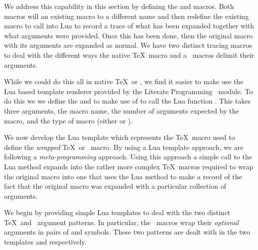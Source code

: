 \stopTestSuite


We address this capability in this section by defining 
the \type{\traceTexMacro} and \type{\traceContextMacro} macros. Both 
macros will \type{\let} an existing macro to a different name and then 
redefine the existing macro to call into Lua to record a trace of what has 
been expanded together with what arguments were provided. Once this has 
been done, then the original macro with its arguments are expanded as 
normal. We have two distinct tracing macros to deal with the different 
ways the  native \TeX\ macro and a  
\ConTeXt\ macros delimit their arguments. 

While we could do this all in native \TeX\ or \ConTeXt, we find it easier 
to make use the Lua based template renderer provided by the Literate 
Programming \ConTeXt\ module. To do this we we define the 
\type{\traceTexMacro} and \type{\traceContextMacro} to make use of 
\type{\directlua} to call the Lua function . This 
 takes three arguments, the macro name, the number 
of arguments expected by the macro, and the type of macro (either 
 or ).

\startMkIVCode
\def\traceTexMacro#1#2{%
  \directlua{%
    thirddata.contests.createTraceMacro('#1', #2, 'tex')
  }
}
\def\traceContextMacro#1#2{%
  \directlua{%
    thirddata.contests.createTraceMacro('#1', #2, 'context')
  }
}

\stopMkIVCode

We now develop the Lua template which represents the \TeX\ macro used to 
define the \emph{wrapped} \TeX\ or \ConTeXt\ macro. By using a Lua 
template approach, we are following a \emph{meta-programming} approach. 
Using this approach a simple call to the Lua method 
 expands into the rather more complex \TeX\ macros 
required to wrap the original macro into one that uses the Lua method 
 to make a record of the fact that the original macro was 
expanded with a particular collection of arguments. 

We begin by providing simple Lua templates to deal with the two distinct 
 \TeX\ and \ConTeXt\ argument patterns. In particular, the 
 \ConTeXt\ macros wrap their \emph{optional} arguments in 
pairs of \quote{[} and \quote{]} symbols. These two patterns are dealt 
with in the two templates  and 
 respectively. 

